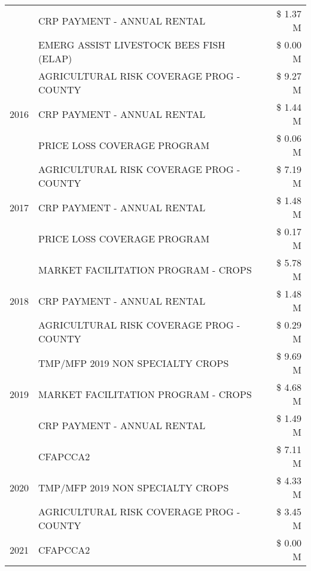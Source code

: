 \begin{tabular}{llr}
 & CRP PAYMENT - ANNUAL RENTAL & \$ 1.37 M \\
 & EMERG ASSIST LIVESTOCK BEES FISH (ELAP) & \$ 0.00 M \\
\cline{1-3}
\multirow[t]{3}{*}{2016} & AGRICULTURAL RISK COVERAGE PROG - COUNTY & \$ 9.27 M \\
 & CRP PAYMENT - ANNUAL RENTAL & \$ 1.44 M \\
 & PRICE LOSS COVERAGE PROGRAM & \$ 0.06 M \\
\cline{1-3}
\multirow[t]{3}{*}{2017} & AGRICULTURAL RISK COVERAGE PROG - COUNTY & \$ 7.19 M \\
 & CRP PAYMENT - ANNUAL RENTAL & \$ 1.48 M \\
 & PRICE LOSS COVERAGE PROGRAM & \$ 0.17 M \\
\cline{1-3}
\multirow[t]{3}{*}{2018} & MARKET FACILITATION PROGRAM - CROPS & \$ 5.78 M \\
 & CRP PAYMENT - ANNUAL RENTAL & \$ 1.48 M \\
 & AGRICULTURAL RISK COVERAGE PROG - COUNTY & \$ 0.29 M \\
\cline{1-3}
\multirow[t]{3}{*}{2019} & TMP/MFP 2019 NON SPECIALTY CROPS & \$ 9.69 M \\
 & MARKET FACILITATION PROGRAM - CROPS & \$ 4.68 M \\
 & CRP PAYMENT - ANNUAL RENTAL & \$ 1.49 M \\
\cline{1-3}
\multirow[t]{3}{*}{2020} & CFAPCCA2 & \$ 7.11 M \\
 & TMP/MFP 2019 NON SPECIALTY CROPS & \$ 4.33 M \\
 & AGRICULTURAL RISK COVERAGE PROG - COUNTY & \$ 3.45 M \\
\cline{1-3}
2021 & CFAPCCA2 & \$ 0.00 M \\
\cline{1-3}
\bottomrule
\end{tabular}
